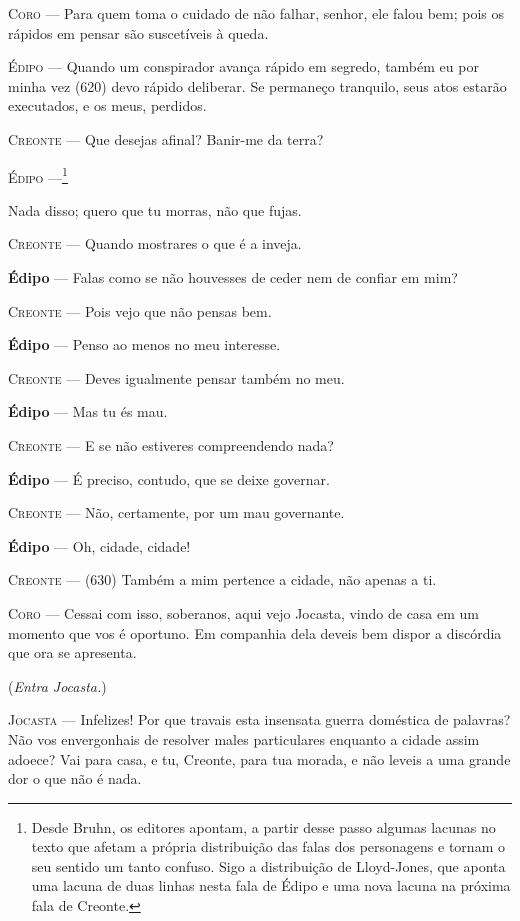\textsc{Coro} --- Para quem toma o cuidado de não falhar, senhor, ele falou bem; pois os
rápidos em pensar são suscetíveis à queda.

\textsc{Édipo} --- Quando um conspirador avança rápido em segredo, também eu por minha vez
(620) devo rápido deliberar. Se permaneço tranquilo, seus atos estarão
executados, e os meus, perdidos.

\textsc{Creonte} --- Que desejas afinal? Banir-me da terra?

\textsc{Édipo} ---\footnote{Desde Bruhn, os editores apontam, a partir desse
  passo algumas lacunas no texto que afetam a própria distribuição das
  falas dos personagens e tornam o seu sentido um tanto confuso. Sigo a
  distribuição de Lloyd-Jones, que aponta uma lacuna de duas linhas
  nesta fala de Édipo e uma nova lacuna na próxima fala de Creonte.}

Nada disso; quero que tu morras, não que fujas.

\textsc{Creonte} --- Quando mostrares o que é a inveja.

\textbf{Édipo} --- Falas como se não houvesses de ceder nem de confiar em mim?

\textsc{Creonte} --- Pois vejo que não pensas bem.

\textbf{Édipo} --- Penso ao menos no meu interesse.

\textsc{Creonte} --- Deves igualmente pensar também no meu.

\textbf{Édipo} --- Mas tu és mau.

\textsc{Creonte} --- E se não estiveres compreendendo nada?

\textbf{Édipo} --- É preciso, contudo, que se deixe governar.

\textsc{Creonte} --- Não, certamente, por um mau governante.

\textbf{Édipo} --- Oh, cidade, cidade!

\textsc{Creonte} --- (630) Também a mim pertence a cidade, não apenas a ti.

\textsc{Coro} --- Cessai com isso, soberanos, aqui vejo Jocasta, vindo de casa em um
momento que vos é oportuno. Em companhia dela deveis bem dispor a
discórdia que ora se apresenta.

(\emph{Entra Jocasta.})

\textsc{Jocasta} --- Infelizes! Por que travais esta insensata guerra doméstica de palavras?
Não vos envergonhais de resolver males particulares enquanto a cidade
assim adoece? Vai para casa, e tu, Creonte, para tua morada, e não
leveis a uma grande dor o que não é nada.

